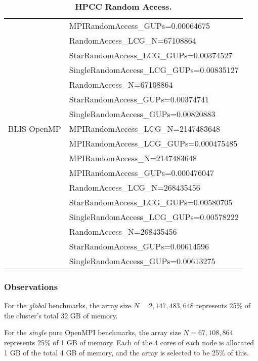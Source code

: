 \begin{table}[]
\begin{center}
\begin{tabular}{ |l|l| }
                & MPIRandomAccess\_GUPs=0.00064675 \\
                \cline{2-2} 
                & RandomAccess\_LCG\_N=67108864 \\
                & StarRandomAccess\_LCG\_GUPs=0.00374527 \\
                & SingleRandomAccess\_LCG\_GUPs=0.00835127 \\
                \cline{2-2} 
                & RandomAccess\_N=67108864 \\
                & StarRandomAccess\_GUPs=0.00374741 \\
                & SingleRandomAccess\_GUPs=0.00820883 \\
\hline
BLIS OpenMP     & MPIRandomAccess\_LCG\_N=2147483648 \\
                & MPIRandomAccess\_LCG\_GUPs=0.000475485 \\
                \cline{2-2} 
                & MPIRandomAccess\_N=2147483648 \\
                & MPIRandomAccess\_GUPs=0.000476047 \\
                \cline{2-2} 
                & RandomAccess\_LCG\_N=268435456 \\
                & StarRandomAccess\_LCG\_GUPs=0.00580705 \\
                & SingleRandomAccess\_LCG\_GUPs=0.00578222 \\
                \cline{2-2} 
                & RandomAccess\_N=268435456 \\
                & StarRandomAccess\_GUPs=0.00614596 \\
                & SingleRandomAccess\_GUPs=0.00613275 \\
\hline
\end{tabular}
\end{center}
\caption{\label{tab:table-name}\textbf{HPCC Random Access.}}
\end{table}


\subsubsection{Observations}

For the \emph{global} benchmarks, the array size $N = 2,147,483,648$ represents 25\% of the cluster's total 32 GB of memory.

For the \emph{single} pure OpenMPI benchmarks, the array size $N = 67,108,864$ represents 25\% of 1 GB of memory. Each of the 4 cores of each node is allocated 1 GB of the total 4 GB of memory, and the array is selected to be 25\% of this.

